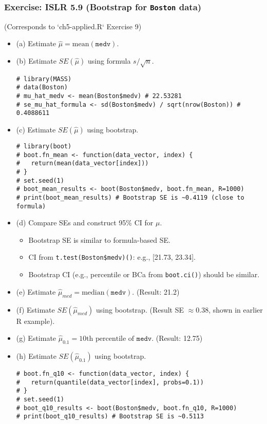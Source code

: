 \documentclass[12pt,a4paper]{article}
\newcommand{\Rfunction}[1]{\texttt{#1()}} %
\newcommand{\Robject}[1]{\texttt{#1}} %
\begin{document}
\begin{itemize}
\begin{itemize}
\begin{itemize}
    \subsubsection{Exercise: ISLR 5.9 (Bootstrap for \Robject{Boston} data)}
        (Corresponds to `ch5-applied.R` Exercise 9)
        \begin{itemize}
            \item (a) Estimate $\hat{\mu} = \text{mean}(\Robject{medv})$.
            \item (b) Estimate $SE(\hat{\mu})$ using formula $s/\sqrt{n}$.
\begin{lstlisting}[caption={Mean and SE of Mean for Boston$medv}]
# library(MASS)
# data(Boston)
# mu_hat_medv <- mean(Boston$medv) # 22.53281
# se_mu_hat_formula <- sd(Boston$medv) / sqrt(nrow(Boston)) # 0.4088611
\end{lstlisting}
            \item (c) Estimate $SE(\hat{\mu})$ using bootstrap.
\begin{lstlisting}[caption={Bootstrap SE of Mean for Boston$medv}]
# library(boot)
# boot.fn_mean <- function(data_vector, index) {
#   return(mean(data_vector[index]))
# }
# set.seed(1)
# boot_mean_results <- boot(Boston$medv, boot.fn_mean, R=1000)
# print(boot_mean_results) # Bootstrap SE is ~0.4119 (close to formula)
\end{lstlisting}
            \item (d) Compare SEs and construct 95\% CI for $\mu$.
                \begin{itemize}
                    \item Bootstrap SE is similar to formula-based SE.
                    \item CI from \Rfunction{t.test(Boston\$medv)}: e.g., [21.73, 23.34].
                    \item Bootstrap CI (e.g., percentile or BCa from \Rfunction{boot.ci}) should be similar.
                \end{itemize}
            \item (e) Estimate $\hat{\mu}_{med} = \text{median}(\Robject{medv})$. (Result: 21.2)
            \item (f) Estimate $SE(\hat{\mu}_{med})$ using bootstrap. (Result SE $\approx 0.38$, shown in earlier R example).
            \item (g) Estimate $\hat{\mu}_{0.1} = \text{10th percentile of } \Robject{medv}$. (Result: 12.75)
            \item (h) Estimate $SE(\hat{\mu}_{0.1})$ using bootstrap.
\begin{lstlisting}[caption={Bootstrap SE for 10th Percentile of Boston$medv}]
# boot.fn_q10 <- function(data_vector, index) {
#   return(quantile(data_vector[index], probs=0.1))
# }
# set.seed(1)
# boot_q10_results <- boot(Boston$medv, boot.fn_q10, R=1000)
# print(boot_q10_results) # Bootstrap SE is ~0.5113
\end{lstlisting}
        \end{itemize}


\end{itemize}
\end{itemize}
\end{itemize}
\end{document}
